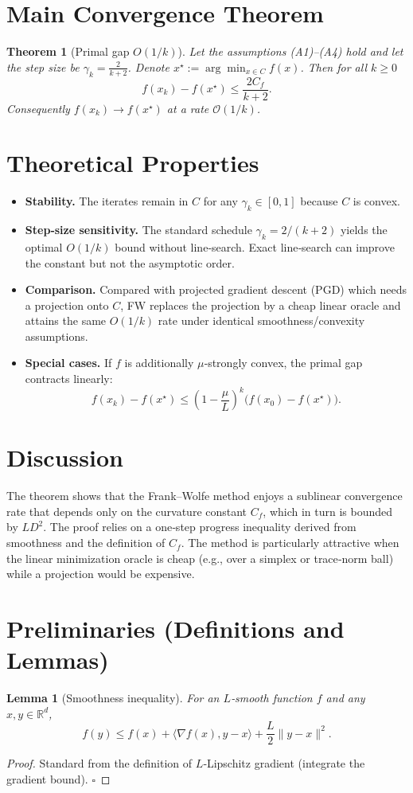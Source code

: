 \documentclass{article}
\newtheorem{theorem}{Theorem}
\newtheorem{lemma}{Lemma}
\begin{document}
\section*{Main Convergence Theorem}
\begin{theorem}[Primal gap $O(1/k)$]\label{thm:fw}
Let the assumptions (A1)–(A4) hold and let the step size be $\gamma_k = \frac{2}{k+2}$.
Denote $x^\star:=\arg\min_{x\in C}f(x)$. Then for all $k\ge 0$
\[
f(x_k)-f(x^\star) \le \frac{2C_f}{k+2}. \tag{4}
\]
Consequently $f(x_k)\to f(x^\star)$ at a rate $\mathcal{O}(1/k)$.
\end{theorem}

\section*{Theoretical Properties}
\begin{itemize}
\item \textbf{Stability.} The iterates remain in $C$ for any $\gamma_k\in[0,1]$ because $C$ is convex.
\item \textbf{Step‑size sensitivity.} The standard schedule $\gamma_k=2/(k+2)$ yields the optimal $O(1/k)$ bound without line‑search. Exact line‑search can improve the constant but not the asymptotic order.
\item \textbf{Comparison.} Compared with projected gradient descent (PGD) which needs a projection onto $C$, FW replaces the projection by a cheap linear oracle and attains the same $O(1/k)$ rate under identical smoothness/convexity assumptions.
\item \textbf{Special cases.} If $f$ is additionally $\mu$‑strongly convex, the primal gap contracts linearly:
\[
f(x_k)-f(x^\star) \le \left(1-\frac{\mu}{L}\right)^{k}\bigl(f(x_0)-f(x^\star)\bigr).
\]
\end{itemize}

\section*{Discussion}
The theorem shows that the Frank–Wolfe method enjoys a sublinear convergence rate that depends only on the curvature constant $C_f$, which in turn is bounded by $L D^2$. The proof relies on a one‑step progress inequality derived from smoothness and the definition of $C_f$. The method is particularly attractive when the linear minimization oracle is cheap (e.g., over a simplex or trace‑norm ball) while a projection would be expensive.

\newpage
\section*{Preliminaries (Definitions and Lemmas)}
\begin{lemma}[Smoothness inequality]\label{lem:smooth}
For an $L$‑smooth function $f$ and any $x,y\in\mathbb{R}^d$,
\[
f(y)\le f(x)+\langle\nabla f(x),y-x\rangle+\frac{L}{2}\|y-x\|^{2}. \tag{5}
\]
\end{lemma}
\begin{proof}
Standard from the definition of $L$‑Lipschitz gradient (integrate the gradient bound). $\square$
\end{proof}
\end{document}
